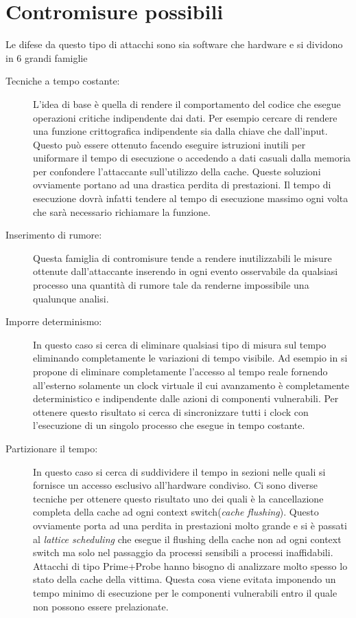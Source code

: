 		\section{Contromisure possibili}
			Le difese da questo tipo di attacchi sono sia software che hardware e si dividono in 6 grandi famiglie\cite{ge2016survey}
			
			\begin{description}
				\item[Tecniche a tempo costante:] L'idea di base è quella di rendere il comportamento del codice che esegue operazioni critiche indipendente dai dati. Per esempio cercare di rendere una funzione crittografica indipendente sia dalla chiave che dall'input. Questo può essere ottenuto facendo eseguire istruzioni inutili per uniformare il tempo di esecuzione o accedendo a dati casuali dalla memoria per confondere l'attaccante sull'utilizzo della cache. Queste soluzioni ovviamente portano ad una drastica perdita di prestazioni. Il tempo di esecuzione dovrà infatti tendere al tempo di esecuzione massimo ogni volta che sarà necessario richiamare la funzione.
				\item[Inserimento di rumore:] Questa famiglia di contromisure tende a rendere inutilizzabili le misure ottenute dall'attaccante inserendo in ogni evento osservabile da qualsiasi processo una quantità di rumore tale da renderne impossibile una qualunque analisi\cite{hu1992reducing}.
				\item[Imporre determinismo:] In questo caso si cerca di eliminare qualsiasi tipo di misura sul tempo eliminando completamente le variazioni di tempo visibile. Ad esempio in \cite{aviram2012efficient} si propone di eliminare completamente l'accesso al tempo reale fornendo all'esterno solamente un clock virtuale il cui avanzamento è completamente deterministico e indipendente dalle azioni di componenti vulnerabili. Per ottenere questo risultato si cerca di sincronizzare tutti i clock con l'esecuzione di un singolo processo che esegue in tempo costante.
				\item[Partizionare il tempo:] In questo caso si cerca di suddividere il tempo in sezioni nelle quali si fornisce un accesso esclusivo all'hardware condiviso. Ci sono diverse tecniche per ottenere questo risultato uno dei quali è la cancellazione completa della cache ad ogni context switch(\emph{cache flushing}). Questo ovviamente porta ad una perdita in prestazioni molto grande e si è passati al \emph{lattice scheduling} che esegue il flushing della cache non ad ogni context switch ma solo nel passaggio da processi sensibili a processi inaffidabili. Attacchi di tipo Prime+Probe hanno bisogno di analizzare molto spesso lo stato della cache della vittima. Questa cosa viene evitata imponendo un tempo minimo di esecuzione per le componenti vulnerabili entro il quale non possono essere prelazionate.
				 
			\end{description}
